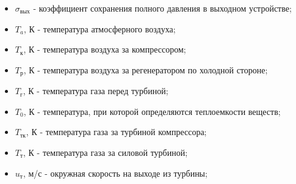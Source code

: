 \begin{itemize}
    \item[] $\sigma_{вых}$ - коэффициент сохранения полного давления в выходном устройстве;
    \item[] $T_a$, К - температура атмосферного воздуха;
    \item[] $T_к$, К - температура воздуха за компрессором;
    \item[] $T_р$, К - температура воздуха за регенератором по холодной стороне;
    \item[] $T_г$, К - температура газа перед турбиной;
    \item[] $T_0$, К - температура, при которой определяются теплоемкости веществ;
    \item[] $T_{тк}$, К - температура газа за турбиной компрессора;
    \item[] $T_т$, К - температура газа за силовой турбиной;
    \item[] $u_т$, м/с - окружная скорость на выходе из турбины;
\end{itemize}